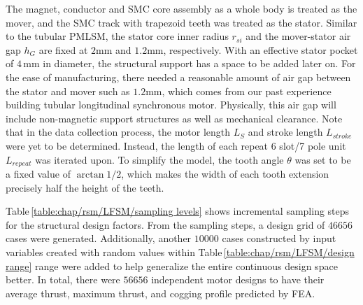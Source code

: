             
            The magnet, conductor and \acs{SMC} core assembly as a whole body is treated as the mover, and the \acs{SMC} track with trapezoid teeth was treated as the stator. Similar to the tubular \acs{PMLSM}, the stator core inner radius $r_{si}$ and the mover-stator air gap $h_G$ are fixed at $2\mathrm{mm}$ and $1.2\mathrm{mm}$, respectively. With an effective stator pocket of $4\,\mathrm{mm}$ in diameter, the structural support has a space to be added later on. For the ease of manufacturing, there needed a reasonable amount of air gap between the stator and mover such as $1.2\mathrm{mm}$, which comes from our past experience building tubular longitudinal synchronous motor. Physically, this air gap will include non-magnetic support structures as well as mechanical clearance. Note that in the data collection process, the motor length $L_S$ and stroke length $L_{stroke}$ were yet to be determined. Instead, the length of each repeat 6 slot/7 pole unit $L_{repeat}$ was iterated upon. To simplify the model, the tooth angle $\theta$ was set to be a fixed value of $\arctan{1/2}$, which makes the width of each tooth extension precisely half the height of the teeth.
            
            
            Table\,\ref{table:chap/rsm/LFSM/sampling levels} shows incremental sampling steps for the structural design factors. From the sampling steps, a design grid of $46656$ cases were generated. Additionally, another $10000$ cases constructed by input variables created with random values within Table\,\ref{table:chap/rsm/LFSM/design range} range were added to help generalize the entire continuous design space better. In total, there were $56656$ independent motor designs to have their average thrust, maximum thrust, and cogging profile predicted by \acs{FEA}.
            
